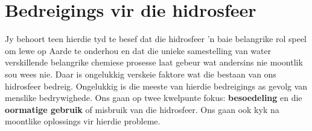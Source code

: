 \section{Bedreigings vir die hidrosfeer}
            \nopagebreak

Jy behoort teen hierdie tyd te besef dat die hidrosfeer  'n baie belangrike rol speel om lewe op Aarde te onderhou en dat die unieke samestelling van water verskillende belangrike chemiese prosesse laat gebeur wat andersins nie moontlik sou wees nie. Daar is ongelukkig verskeie faktore wat die bestaan van ons hidrosfeer bedreig. Ongelukkig is die meeste van hierdie bedreigings as gevolg van menslike bedrywighede. Ons gaan op twee kwelpunte fokus: \textbf{besoedeling} en die \textbf{oormatige gebruik} of misbruik van die hidrosfeer. Ons gaan ook kyk na moontlike oplossings vir hierdie probleme.

 \\

